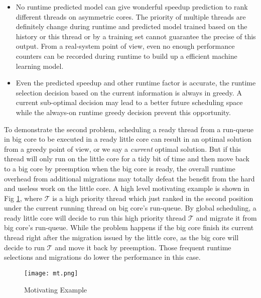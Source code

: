 \documentclass[pageno]{jpaper}
\begin{document}
\begin{itemize}
\item[1.] No runtime predicted model  can give wonderful speedup prediction to rank different threads on asymmetric cores. The priority of multiple threads are definitely change during runtime and predicted model trained based on the history or this thread or by a training set cannot guarantee the precise of this output. From a real-system point of view, even no enough performance counters can be recorded during runtime to build up a efficient machine learning model.   
\item[2.] Even the predicted speedup and other runtime factor is accurate,  the runtime selection decision based on the current information is always in greedy. A current sub-optimal decision may lead to a better future scheduling space while the always-on runtime greedy decision prevent this opportunity. 
\end{itemize}
 
To demonstrate the second problem, scheduling a ready thread from a run-queue in big core to be executed in a ready little core can result in an optimal solution from a greedy point of view, or we say a {\it current} optimal solution. But if this thread will only run on the little core for a tidy bit of time and then move back to a big core by preemption when the big core is ready, the overall runtime overhead from additional migrations may totally defeat the benefit from the hard and useless work on the little core. A high level motivating example is shown in Fig \ref{mt}, where $\mathcal{T}$ is a high priority thread which just ranked in the second position under the current running thread on big core's run-queue. By global scheduling, a ready little core will decide to run this high priority thread $\mathcal{T}$ and migrate it from big core's run-queue. While the problem happens if the big core finish its current thread right after the migration issued by the little core, as the big core will decide to run $\mathcal{T}$ and move it back by preemption. Those frequent runtime selections and migrations do lower the performance in this case.
\begin{figure}
\centering
\texttt{[image: mt.png]}
\caption{Motivating Example}
\label{mt}
\end{figure}
\end{document}
